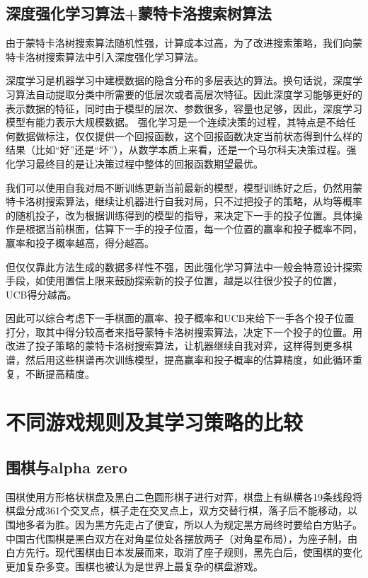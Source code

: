 \documentclass[c5size]{ctexart}
\begin{document}
\subsection{深度强化学习算法+蒙特卡洛搜索树算法}
	由于蒙特卡洛树搜索算法随机性强，计算成本过高，为了改进搜索策略，我们向蒙特卡洛树搜索算法中引入深度强化学习算法。
	
	深度学习是机器学习中建模数据的隐含分布的多层表达的算法。换句话说，深度学习算法自动提取分类中所需要的低层次或者高层次特征。因此深度学习能够更好的表示数据的特征，同时由于模型的层次、参数很多，容量也足够，因此，深度学习模型有能力表示大规模数据。
	强化学习是一个连续决策的过程，其特点是不给任何数据做标注，仅仅提供一个回报函数，这个回报函数决定当前状态得到什么样的结果（比如“好”还是“坏”），从数学本质上来看，还是一个马尔科夫决策过程。强化学习最终目的是让决策过程中整体的回报函数期望最优。
	
	我们可以使用自我对局不断训练更新当前最新的模型，模型训练好之后，仍然用蒙特卡洛树搜索算法，继续让机器进行自我对局，只不过把投子的策略，从均等概率的随机投子，改为根据训练得到的模型的指导，来决定下一手的投子位置。具体操作是根据当前棋面，估算下一手的投子位置，每一个位置的赢率和投子概率不同，赢率和投子概率越高，得分越高。
	
	但仅仅靠此方法生成的数据多样性不强，因此强化学习算法中一般会特意设计探索手段，如使用置信上限来鼓励探索新的投子位置，越是以往很少投子的位置，UCB得分越高。
	
	因此可以综合考虑下一手棋面的赢率、投子概率和UCB来给下一手各个投子位置打分，取其中得分较高者来指导蒙特卡洛树搜索算法，决定下一个投子的位置。用改进了投子策略的蒙特卡洛树搜索算法，让机器继续自我对弈，这样得到更多棋谱，然后用这些棋谱再次训练模型，提高赢率和投子概率的估算精度，如此循环重复，不断提高精度。
	
\section{不同游戏规则及其学习策略的比较}
\subsection{围棋与alpha zero}
	围棋使用方形格状棋盘及黑白二色圆形棋子进行对弈，棋盘上有纵横各19条线段将棋盘分成361个交叉点，棋子走在交叉点上，双方交替行棋，落子后不能移动，以围地多者为胜。因为黑方先走占了便宜，所以人为规定黑方局终时要给白方贴子。中国古代围棋是黑白双方在对角星位处各摆放两子（对角星布局），为座子制，由白方先行。现代围棋由日本发展而来，取消了座子规则，黑先白后，使围棋的变化更加复杂多变。围棋也被认为是世界上最复杂的棋盘游戏。\par
	
\end{document}

